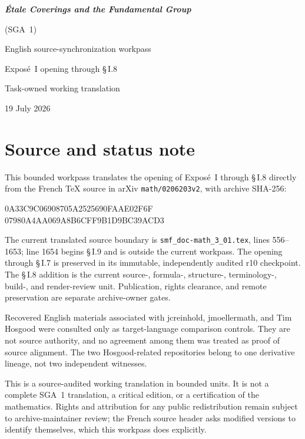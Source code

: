 \documentclass[11pt,oneside]{amsbook}
\begin{document}
\frontmatter
\begin{titlepage}
  \centering
  \vspace*{35mm}
  {\Huge\bfseries \textit{Étale Coverings and the Fundamental Group}\par}
  \vspace{3mm}
  {\LARGE (SGA~1)\par}
  \vspace{20mm}
  {\Large English source-synchronization workpass\par}
  \vspace{3mm}
  {\Large Exposé~I opening through \S\,I.8\par}
  \vfill
  {\large Task-owned working translation\par}
  \vspace{5mm}
  {\large 19 July 2026\par}
\end{titlepage}

\chapter*{Source and status note}

This bounded workpass translates the opening of Exposé~I through \S\,I.8 directly
from the French \TeX{} source in arXiv \texttt{math/0206203v2}, with archive
SHA-256:
\begin{center}
  \small\ttfamily
  0A33C9C06908705A2525690FAAE02F6F\\
  07980A4AA069A8B6CFF9B1D9BC39ACD3
\end{center}
The current translated source boundary is
\texttt{smf\_doc-math\_3\_01.tex}, lines 556--1653; line 1654 begins \S\,I.9
and is outside the current workpass.  The opening through \S\,I.7 is preserved in its immutable, independently
audited r10 checkpoint.  The \S\,I.8 addition is the current source-, formula-,
structure-, terminology-, build-, and render-review unit.  Publication,
rights clearance, and remote preservation are separate archive-owner gates.

Recovered English materials associated with jcreinhold, jmoellermath, and
Tim Hosgood were consulted only as target-language comparison controls.
They are not source authority, and no agreement among them was treated as
proof of source alignment.  The two Hosgood-related repositories belong to
one derivative lineage, not two independent witnesses.

This is a source-audited working translation in bounded units.  It is not
a complete SGA~1 translation, a critical edition, or a certification of the
mathematics.  Rights and attribution for any public redistribution remain
subject to archive-maintainer review; the French source header asks modified
versions to identify themselves, which this workpass does explicitly.
\end{document}

